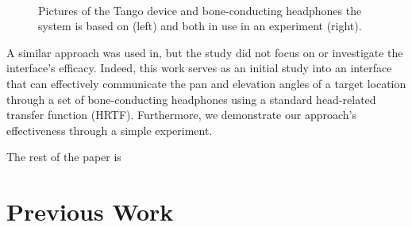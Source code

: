 \documentclass{llncs}
\begin{document}
\begin{figure}[t]
  \centering
~
  \caption{Pictures of the Tango device and bone-conducting headphones the system is based on (left) and both in use in an experiment (right).}
\end{figure}

A similar approach was used in\cite{durette2008visuo}, but the study did not focus on or investigate the interface's efficacy.
Indeed, this work serves as an initial study into an interface that can effectively communicate the pan and elevation angles of a target location through a set of bone-conducting headphones using a standard head-related transfer function (HRTF).
Furthermore, we demonstrate our approach's effectiveness through a simple experiment.

The rest of the paper is 

\section{Previous Work}
\end{document}
